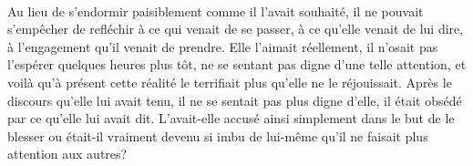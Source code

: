 \paragraph{}
Au lieu de s'endormir paisiblement comme il l'avait souhaité, il ne pouvait
s'empêcher de refléchir à ce qui venait de se passer, à ce qu'elle venait de
lui dire, à l'engagement qu'il venait de prendre. Elle l'aimait réellement, il
n'osait pas l'espérer quelques heures plus tôt, ne se sentant pas digne d'une
telle attention, et voilà qu'à présent cette réalité le terrifiait plus
qu'elle ne le réjouissait. Après le discours qu'elle lui avait tenu, il ne
se sentait pas plus digne d'elle, il était obsédé par ce qu'elle lui avait
dit. L'avait-elle accusé ainsi simplement dans le but de le blesser ou
était-il vraiment devenu si imbu de lui-même qu'il ne faisait plus attention
aux autres?

\contextswitch